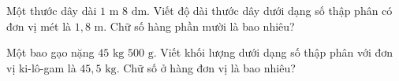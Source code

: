 \begin{ex}
  Một thước dây dài $1\text{ m } 8\text{ dm}$. Viết độ dài thước dây dưới dạng số thập phân có đơn vị mét là $1{,}8\text{ m}$. Chữ số hàng phần mười là bao nhiêu?
\end{ex}

\begin{ex}
  Một bao gạo nặng $45\text{ kg } 500\text{ g}$. Viết khối lượng dưới dạng số thập phân với đơn vị ki-lô-gam là $45{,}5\text{ kg}$. Chữ số ở hàng đơn vị là bao nhiêu?
\end{ex}
